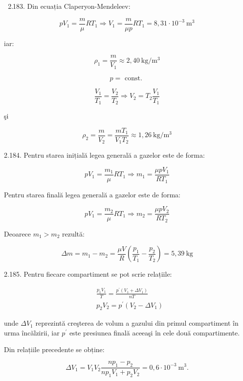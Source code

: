 \documentclass[10pt]{article}
\begin{document}
\begin{enumerate}
  \setcounter{enumi}{1}
  \item 
  \begin{enumerate}
    \setcounter{enumii}{182}
    \item Din ecuația Claperyon-Mendeleev:
  \end{enumerate}
\end{enumerate}

$$
p V_{1}=\frac{m}{\mu} R T_{1} \Rightarrow V_{1}=\frac{m}{\mu p} R T_{1}=8,31 \cdot 10^{-3} \mathrm{~m}^{3}
$$

iar:

$$
\rho_{1}=\frac{m}{V_{1}} \approx 2,40 \mathrm{~kg} / \mathrm{m}^{3}
$$

$$
p=\text { const. }
$$

$$
\frac{V_{1}}{T_{1}}=\frac{V_{2}}{T_{2}} \Rightarrow V_{2}=T_{2} \frac{V_{1}}{T_{1}}
$$

şi

$$
\rho_{2}=\frac{m}{V_{2}}=\frac{m T_{1}}{V_{1} T_{2}} \approx 1,26 \mathrm{~kg} / \mathrm{m}^{3}
$$

2.184. Pentru starea inițială legea generală a gazelor este de forma:

$$
p V_{1}=\frac{m_{1}}{\mu} R T_{1} \Rightarrow m_{1}=\frac{\mu p V_{1}}{R T_{1}}
$$

Pentru starea finală legea generală a gazelor este de forma:

$$
p V_{1}=\frac{m_{2}}{\mu} R T_{1} \Rightarrow m_{2}=\frac{\mu p V_{2}}{R T_{2}}
$$

Deoarece $m_{1}>m_{2}$ rezultă:

$$
\Delta m=m_{1}-m_{2}=\frac{\mu V}{R}\left(\frac{p_{1}}{T_{1}}-\frac{p_{2}}{T_{2}}\right)=5,39 \mathrm{~kg}
$$

2.185. Pentru fiecare compartiment se pot scrie relațiile:

$$
\begin{aligned}
& \frac{p_{1} V_{1}}{T}=\frac{p^{\prime}\left(V_{1}+\Delta V_{1}\right)}{n T} \\
& p_{2} V_{2}=p^{\prime}\left(V_{2}-\Delta V_{1}\right)
\end{aligned}
$$

unde $\Delta V_{1}$ reprezintă creşterea de volum a gazului din primul compartiment în urma încălzirii, iar $p^{\prime}$ este presiunea finală aceeaşi în cele două compartimente.

Din relațiile precedente se obține:

$$
\Delta V_{1}=V_{1} V_{2} \frac{n p_{1}-p_{2}}{n p_{1} V_{1}+p_{2} V_{2}}=0,6 \cdot 10^{-3} \mathrm{~m}^{3} .
$$
\end{document}
